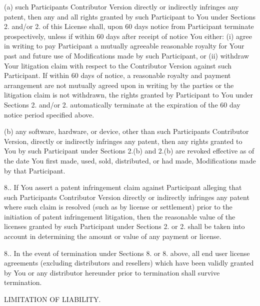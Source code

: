 \begin{DoxyEnumerate}
(a) such Participant\textquotesingle{}s Contributor Version directly or indirectly infringes any patent, then any and all rights granted by such Participant to You under Sections 2. and/or 2. of this License shall, upon 60 days notice from Participant terminate prospectively, unless if within 60 days after receipt of notice You either\+: (i) agree in writing to pay Participant a mutually agreeable reasonable royalty for Your past and future use of Modifications made by such Participant, or (ii) withdraw Your litigation claim with respect to the Contributor Version against such Participant. If within 60 days of notice, a reasonable royalty and payment arrangement are not mutually agreed upon in writing by the parties or the litigation claim is not withdrawn, the rights granted by Participant to You under Sections 2. and/or 2. automatically terminate at the expiration of the 60 day notice period specified above.

(b) any software, hardware, or device, other than such Participant\textquotesingle{}s Contributor Version, directly or indirectly infringes any patent, then any rights granted to You by such Participant under Sections 2.(b) and 2.(b) are revoked effective as of the date You first made, used, sold, distributed, or had made, Modifications made by that Participant.

8.. If You assert a patent infringement claim against Participant alleging that such Participant\textquotesingle{}s Contributor Version directly or indirectly infringes any patent where such claim is resolved (such as by license or settlement) prior to the initiation of patent infringement litigation, then the reasonable value of the licenses granted by such Participant under Sections 2. or 2. shall be taken into account in determining the amount or value of any payment or license.

8.. In the event of termination under Sections 8. or 8. above, all end user license agreements (excluding distributors and resellers) which have been validly granted by You or any distributor hereunder prior to termination shall survive termination.
\item L\+I\+M\+I\+T\+A\+T\+I\+O\+N O\+F L\+I\+A\+B\+I\+L\+I\+T\+Y.


\end{DoxyEnumerate}
